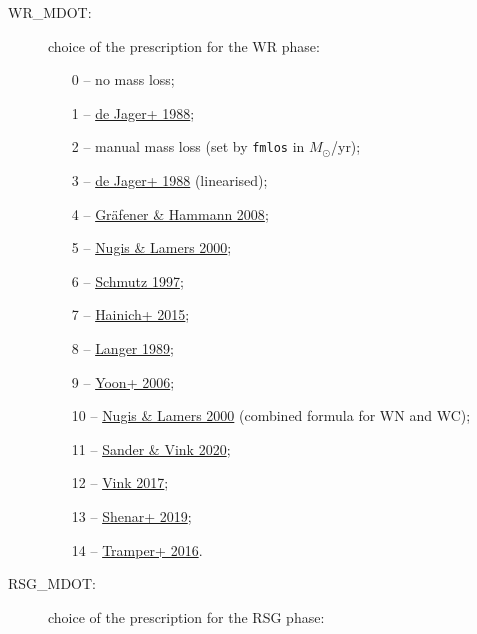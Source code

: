 \documentclass[11pt]{article}
\def\msol{\ensuremath{M_\odot}}
\begin{document}
\begin{description}
\begin{description}
      \item[WR\_MDOT:] choice of the prescription for the WR phase:
         \begin{enumerate}[labelindent=.5cm,font=\ttfamily \bfseries,label=\arabic*]
           \item[0] -- no mass loss;
           \item[1] -- \href{https://ui.adsabs.harvard.edu/abs/1988A&AS...72..259D}{de Jager+ 1988};
           \item[2] -- manual mass loss (set by \texttt{fmlos} in \msol/yr);
           \item[3] -- \href{https://ui.adsabs.harvard.edu/abs/1988A&AS...72..259D}{de Jager+ 1988} (linearised);
           \item[4] -- \href{https://ui.adsabs.harvard.edu/abs/2008A&A...482..945G}{Gr\"afener \& Hammann 2008};
           \item[5] -- \href{https://ui.adsabs.harvard.edu/abs/2000A&A...360..227N}{Nugis \& Lamers 2000};
           \item[6] -- \href{https://ui.adsabs.harvard.edu/abs/1997A&A...321..268S}{Schmutz 1997};
           \item[7] -- \href{https://ui.adsabs.harvard.edu/abs/2015A&A...581A..21H}{Hainich+ 2015};
           \item[8] -- \href{https://ui.adsabs.harvard.edu/abs/1989A&A...220..135L}{Langer 1989};
           \item[9] -- \href{https://ui.adsabs.harvard.edu/abs/2006A&A...460..199Y}{Yoon+ 2006};
           \item[10] -- \href{https://ui.adsabs.harvard.edu/abs/2000A&A...360..227N}{Nugis \& Lamers 2000} (combined formula for WN and WC);
           \item[11] -- \href{https://ui.adsabs.harvard.edu/abs/2020MNRAS.499..873S}{Sander \& Vink 2020};
           \item[12] -- \href{https://ui.adsabs.harvard.edu/abs/2017A&A...607L...8V}{Vink 2017};
           \item[13] -- \href{https://ui.adsabs.harvard.edu/abs/2019A&A...627A.151S}{Shenar+ 2019};
           \item[14] -- \href{https://ui.adsabs.harvard.edu/abs/2016ApJ...833..133T}{Tramper+ 2016}.
        \end{enumerate}
      \item[RSG\_MDOT:] choice of the prescription for the RSG phase:

\end{description}
\end{description}
\end{document}
